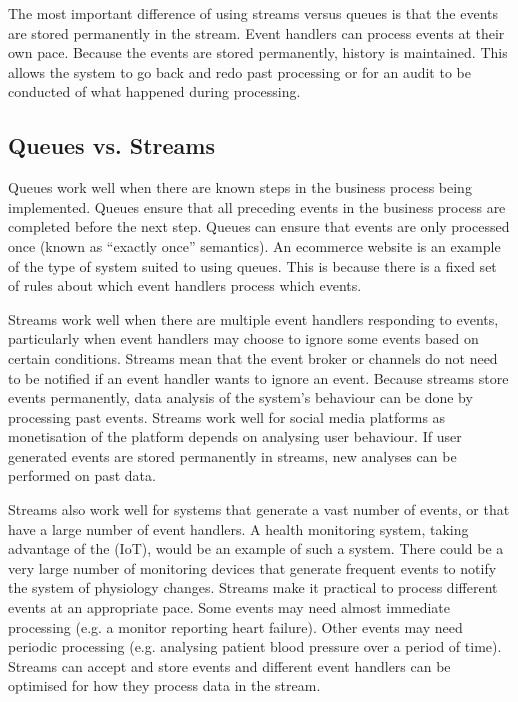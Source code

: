 The most important difference of using streams versus queues is that the events are stored permanently in the stream.
Event handlers can process events at their own pace.
Because the events are stored permanently, history is maintained.
This allows the system to go back and redo past processing or for an audit to be conducted of what happened during processing.

\subsection{Queues vs. Streams}

Queues work well when there are known steps in the business process being implemented.
Queues ensure that all preceding events in the business process are completed before the next step.
Queues can ensure that events are only processed once (known as ``exactly once'' semantics).
An ecommerce website is an example of the type of system suited to using queues.
This is because there is a fixed set of rules about which event handlers process which events.

Streams work well when there are multiple event handlers responding to events,
particularly when event handlers may choose to ignore some events based on certain conditions.
Streams mean that the event broker or channels do not need to be notified if an event handler wants to ignore an event.
Because streams store events permanently, data analysis of the system's behaviour can be done by processing past events.
Streams work well for social media platforms as monetisation of the platform depends on analysing user behaviour.
If user generated events are stored permanently in streams, new analyses can be performed on past data.

Streams also work well for systems that generate a vast number of events,
or that have a large number of event handlers.
A health monitoring system, taking advantage of the  (IoT),
would be an example of such a system.
There could be a very large number of monitoring devices that generate frequent events to notify the system of physiology changes.
Streams make it practical to process different events at an appropriate pace.
Some events may need almost immediate processing (e.g. a monitor reporting heart failure).
Other events may need periodic processing (e.g. analysing patient blood pressure over a period of time).
Streams can accept and store events and different event handlers can be optimised for how they process data in the stream.

